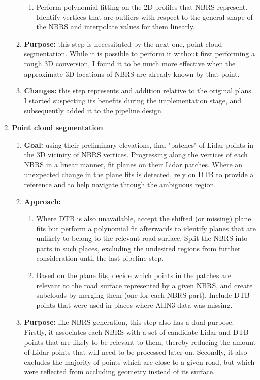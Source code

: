 \begin{enumerate}
\begin{enumerate}
\begin{enumerate}
            \item Perform polynomial fitting on the 2D profiles that NBRS represent. Identify vertices that are outliers with respect to the general shape of the NBRS and interpolate values for them linearly.
        \end{enumerate}
        \item \textbf{Purpose:} this step is necessitated by the next one, point cloud segmentation. While it is possible to perform it without first performing a rough 3D conversion, I found it to be much more effective when the approximate 3D locations of NBRS are already known by that point.
        \item \textbf{Changes:} this step represents and addition relative to the original plans. I started suspecting its benefits during the implementation stage, and subsequently added it to the pipeline design.
    \end{enumerate}
    \item \textbf{Point cloud segmentation}
    \begin{enumerate}
        \item \textbf{Goal:} using their preliminary elevations, find "patches" of Lidar points in the 3D vicinity of NBRS vertices. Progressing along the vertices of each NBRS in a linear manner, fit planes on their Lidar patches. Where an unexpected change in the plane fits is detected, rely on DTB to provide a reference and to help navigate through the ambiguous region.
        \item \textbf{Approach:}
        \begin{enumerate}
            \item Where DTB is also unavailable, accept the shifted (or missing) plane fits but perform a polynomial fit afterwards to identify planes that are unlikely to belong to the relevant road surface. Split the NBRS into parts in such places, excluding the undesired regions from further consideration until the last pipeline step. 
            \item Based on the plane fits, decide which points in the patches are relevant to the road surface represented by a given NBRS, and create subclouds by merging them (one for each NBRS part). Include DTB points that were used in places where AHN3 data was missing.
        \end{enumerate}
        \item \textbf{Purpose:} like NBRS generation, this step also has a dual purpose. Firstly, it associates each NBRS with a set of candidate Lidar and DTB points that are likely to be relevant to them, thereby reducing the amount of Lidar points that will need to be processed later on. Secondly, it also excludes the majority of points which are close to a given road, but which were reflected from occluding geometry instead of its surface.

\end{enumerate}
\end{enumerate}

